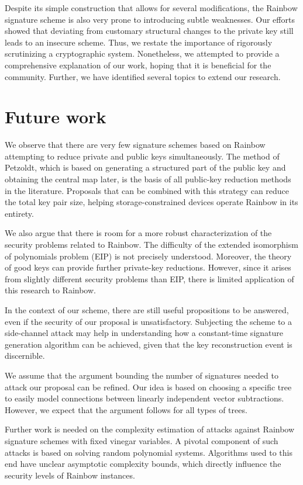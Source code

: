 \documentclass[english]{ufsc-thesis-rn46-2019/ufsc-thesis-rn46-2019}
\theoremstyle{definition}
\begin{document}
Despite its simple construction that allows for several modifications, the
Rainbow signature scheme is also very prone to introducing subtle
weaknesses. Our efforts showed that deviating from customary structural changes
to the private key still leads to an insecure scheme. Thus, we restate the
importance of rigorously scrutinizing a cryptographic system. Nonetheless, we
attempted to provide a comprehensive explanation of our work, hoping that it is
beneficial for the community. Further, we have identified several topics to
extend our research.

\section{Future work}\label{sec:future}

We observe that there are very few signature schemes based on Rainbow
attempting to reduce private and public keys simultaneously. The method of
Petzoldt, which is based on generating a structured part of the public key and
obtaining the central map later, is the basis of all public-key reduction
methods in the literature. Proposals that can be combined with this strategy
can reduce the total key pair size, helping storage-constrained devices operate
Rainbow in its entirety.

We also argue that there is room for a more robust characterization of the
security problems related to Rainbow. The difficulty of the extended
isomorphism of polynomials problem (EIP) is not precisely understood. Moreover,
the theory of good keys can provide further private-key reductions. However,
since it arises from slightly different security problems than EIP, there is
limited application of this research to Rainbow.

In the context of our scheme, there are still useful propositions to be
answered, even if the security of our proposal is unsatisfactory. Subjecting
the scheme to a side-channel attack may help in understanding how
a constant-time signature generation algorithm can be achieved, given that the
key reconstruction event is discernible.

We assume that the argument bounding the number of signatures needed to attack
our proposal can be refined. Our idea is based on choosing a specific tree to
easily model connections between linearly independent vector
subtractions. However, we expect that the argument follows for all types of
trees.

Further work is needed on the complexity estimation of attacks against Rainbow
signature schemes with fixed vinegar variables. A pivotal component of such
attacks is based on solving random polynomial systems. Algorithms used to this
end have unclear asymptotic complexity bounds, which directly influence the
security levels of Rainbow instances.
\end{document}
